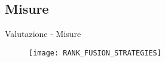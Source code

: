 \subsection{Misure}
\begin{frame}{Valutazione - Misure}
	\begin{figure}
	\texttt{[image: RANK\_FUSION\_STRATEGIES]}
	\end{figure}
	
\end{frame}